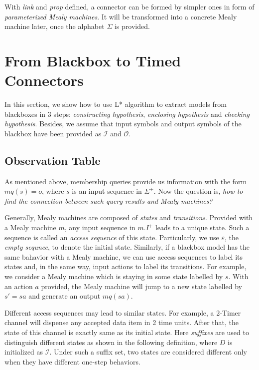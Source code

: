 \documentclass[conference, a4paper]{IEEEtran}
\begin{document}
With \emph{link} and \emph{prop} defined, a connector can be formed by simpler ones in
form of \emph{parameterized Mealy machines}. It will be transformed into a concrete Mealy machine
later, once the alphabet $\Sigma$ is provided.

\section{From Blackbox to Timed Connectors} 
\label{sec:activelearning}
In this section, we show how to use L* algorithm to extract models from blackboxes in  3 steps:
\emph{constructing hypothesis}, \emph{enclosing hypothesis} and \emph{checking hypothesis}. Besides,
we assume that input symbols and output symbols of the blackbox have been provided as $\mathcal{I}$
and $\mathcal{O}$.

\subsection{Observation Table}
As mentioned above, membership queries provide us information with the form $mq(s)=o$, where $s$ is
an input sequence in $\Sigma^{+}$. Now the question is, \emph{how to find the connection between
such query results and Mealy machines?}

Generally, Mealy machines are composed of \emph{states} and \emph{transitions}.
Provided with a Mealy machine $m$, any input sequence in $m.I^+$ leads to a unique state. 
Such a sequence is called an \emph{access sequence} of this state.
Particularly, we use $\varepsilon$, the \emph{empty sequnce}, to denote the initial state.
Similarly, if a blackbox model has the same bahavior with a Mealy machine, we can use access
sequences to label its states and, in the same way, input actions to label its transitions.
For example, we consider a Mealy machine which is staying in some state labelled by $s$. With an
action $a$ provided, the Mealy machine will jump to a new state labelled by $s'=sa$ and generate an
output $mq(sa)$. 

Different access sequences may lead to similar states. For example, a 2-Timer channel will dispense
any accepted data item in 2 time units. After that, the state of this channel is exactly same as its
initial state. Here \emph{suffixes} are used to distinguish different states as shown in the
following definition, where $D$ is initialized as $\mathcal{I}$. Under such a suffix set, two states
are considered different only when they have different one-step behaviors.
\end{document}
